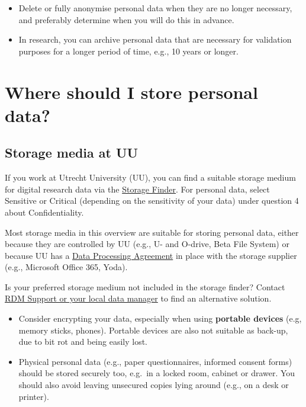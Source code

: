 \documentclass[
]{book}
\providecommand{\tightlist}{%
  \setlength{\itemsep}{0pt}\setlength{\parskip}{0pt}}
\begin{document}
\begin{itemize}
\tightlist
\item
  Delete or fully anonymise personal data when they are no longer necessary,
  and preferably determine when you will do this in advance.
\item
  In research, you can archive personal data that are necessary for validation
  purposes for a longer period of time, e.g., 10 years or longer.
\end{itemize}

\hypertarget{data-storage-where}{%
\section{Where should I store personal data?}\label{data-storage-where}}

\hypertarget{storage-media-at-uu}{%
\subsection{Storage media at UU}\label{storage-media-at-uu}}

If you work at Utrecht University (UU), you can find a suitable storage medium for
digital research data via the
\href{https://tools.uu.nl/storagefinder/}{Storage Finder}. For
personal data, select Sensitive or Critical (depending on the sensitivity of
your data) under question 4 about Confidentiality.

Most storage media in this overview are suitable for storing personal data, either
because they are controlled by UU (e.g., U- and O-drive, Beta File System) or
because UU has a \protect\hyperlink{data-processing-agreement}{Data Processing Agreement} in
place with the storage supplier (e.g., Microsoft Office 365, Yoda).

Is your preferred storage medium not included in the storage finder? Contact
\protect\hyperlink{support}{RDM Support or your local data manager} to find an alternative solution.

\begin{itemize}
\tightlist
\item
  Consider encrypting your data, especially when using \textbf{portable devices}
  (e.g, memory sticks, phones). Portable devices are also not suitable as back-up,
  due to bit rot and being easily lost.
\item
  Physical personal data (e.g., paper questionnaires, informed consent forms)
  should be stored securely too, e.g.~in a locked room, cabinet or drawer. You
  should also avoid leaving unsecured copies lying around (e.g., on a desk or printer).
\end{itemize}
\end{document}
